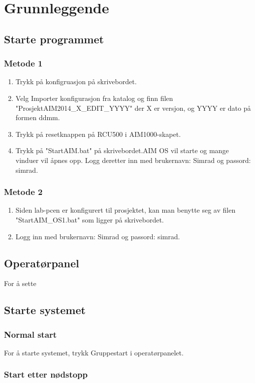 \section{Grunnleggende}
\subsection{Starte programmet}
\subsubsection*{Metode 1}
\begin{enumerate}
	\item Trykk på konfigruasjon på skrivebordet.
  \item Velg Importer konfigurasjon fra katalog og finn filen "ProsjektAIM2014\_X\_EDIT\_YYYY" der X er versjon, og YYYY er dato på formen ddmm.
  \item Trykk på resetknappen på RCU500 i AIM1000-skapet.
	\item Trykk på "StartAIM.bat" på skrivebordet.AIM OS vil starte og mange vinduer vil åpnes opp. Logg deretter inn med brukernavn: Simrad og passord: simrad. 
\end{enumerate}

\subsubsection*{Metode 2}
\begin{enumerate}
  \item Siden lab-pcen er konfigurert til prosjektet, kan man benytte seg av filen "StartAIM\_OS1.bat" som ligger på skrivebordet.
  \item Logg inn med brukernavn: Simrad og passord: simrad.
\end{enumerate}

\subsection{Operatørpanel}
For å sette 

\subsection{Starte systemet}
\subsubsection*{Normal start}
For å starte systemet, trykk Gruppestart i operatørpanelet. 
\subsubsection*{Start etter nødstopp}
